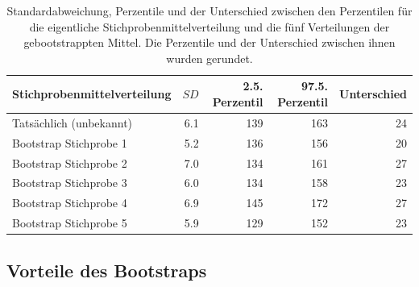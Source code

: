 \documentclass[oneside, 10pt]{book}\usepackage[]{graphicx}\usepackage[]{xcolor}
\begin{document}
\begin{table}[tbp]
\centering
\caption{Standardabweichung, Perzentile und der Unterschied zwischen den Perzentilen für die eigentliche Stichprobenmittelverteilung
und die fünf Verteilungen der gebootstrappten Mittel. Die Perzentile und der Unterschied zwischen ihnen wurden gerundet.}
\label{tab:bootstrap}
\begin{tabular}{lrrrr}
\toprule
Stichprobenmittelverteilung     & $SD$  & 2.5. Perzentil  & 97.5. Perzentil & Unterschied \\
\midrule
Tatsächlich (unbekannt)         & 6.1   & 139          & 163          & 24 \\
\midrule
Bootstrap Stichprobe 1          & 5.2   & 136          & 156          & 20 \\
Bootstrap Stichprobe 2          & 7.0   & 134          & 161          & 27 \\
Bootstrap Stichprobe 3          & 6.0   & 134          & 158          & 23 \\
Bootstrap Stichprobe 4          & 6.9   & 145          & 172          & 27 \\
Bootstrap Stichprobe 5          & 5.9   & 129          & 152          & 23 \\
 \bottomrule
\end{tabular}
\end{table}

\subsection{Vorteile des Bootstraps}
\end{document}
